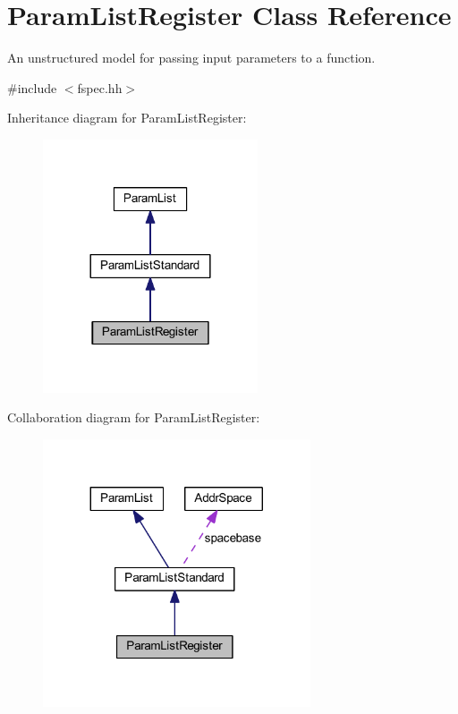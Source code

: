 \hypertarget{class_param_list_register}{}\section{Param\+List\+Register Class Reference}
\label{class_param_list_register}


An unstructured model for passing input parameters to a function.  




{\ttfamily \#include $<$fspec.\+hh$>$}



Inheritance diagram for Param\+List\+Register\+:
\nopagebreak
\begin{figure}[H]
\begin{center}
\leavevmode
\includegraphics[width=180pt]{class_param_list_register__inherit__graph}
\end{center}
\end{figure}


Collaboration diagram for Param\+List\+Register\+:
\nopagebreak
\begin{figure}[H]
\begin{center}
\leavevmode
\includegraphics[width=224pt]{class_param_list_register__coll__graph}
\end{center}
\end{figure}

